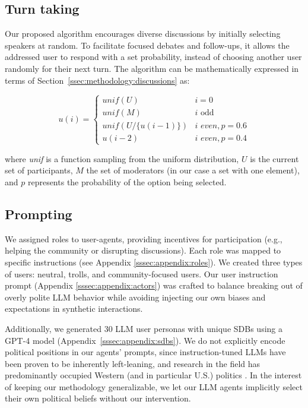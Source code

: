\subsection{Turn taking}
\label{ssec:experimental:turn}

Our proposed algorithm encourages diverse discussions by initially selecting speakers at random. To facilitate focused debates and follow-ups, it allows the addressed user to respond with a set probability, instead of choosing another user randomly for their next turn. The algorithm can be mathematically expressed in terms of Section~\ref{ssec:methodology:discussions} as:

\small
\begin{equation}
\label{eq:turn_taking}
    u(i) = \left\{
\begin{array}{ll}
\textit{unif}(U) & i=0\\
    \textit{unif}(M) & i \text{ odd}\\
    \textit{unif}(U/\{u(i-1)\}) & i \textit{ even}, p=0.6 \\
    u(i-2) & i \textit{ even}, p=0.4 
\end{array} 
\right.
\end{equation}
\normalsize

\noindent where \textit{unif} is a function sampling from the uniform distribution, $U$ is the current set of participants, $M$ the set of moderators (in our case a set with one element), and $p$ represents the probability of the option being selected.


\subsection{Prompting}
\label{ssec:experimental:prompts}

We assigned roles to user-agents, providing incentives for participation (e.g., helping the community or disrupting discussions). Each role was mapped to specific instructions (see Appendix \ref{sssec:appendix:roles}). We created three types of users: neutral, trolls, and community-focused users. Our user instruction prompt (Appendix \ref{sssec:appendix:actors}) was crafted to balance breaking out of overly polite \ac{LLM} behavior while avoiding injecting our own biases and expectations in synthetic interactions. 

Additionally, we generated 30 \ac{LLM} user personas with unique \acp{SDB} using a GPT-4 model \cite{openai2024gpt4technicalreport} (Appendix~\ref{sssec:appendix:sdbs}). We do not explicitly encode political positions in our agents' prompts, since instruction-tuned \acp{LLM} have been proven to be inherently left-leaning, and research in the field has predominantly occupied Western (and in particular U.S.) politics \cite{Taubenfeld2024SystematicBI, potter-etal-2024-hidden, political_2024, pit2024oninvestigatingpoliticalstance}. In the interest of keeping our methodology generalizable, we let our \ac{LLM} agents implicitly select their own political beliefs without our intervention.



